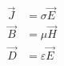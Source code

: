\begin{equation}
\begin{split}
\vec{J} &= \sigma \vec{E} \\
\vec{B} &= \mu \vec{H} \\
\vec{D} &= \varepsilon \vec{E}
\end{split}
\label{eq:constitutive_relations_full}
\end{equation}

